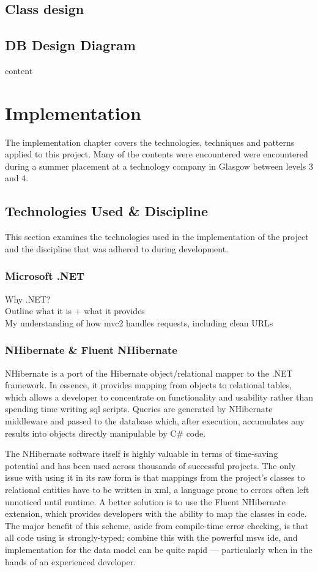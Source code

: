 \documentclass{l4proj}
\begin{document}
\section{Class design}

\section{DB Design Diagram}
content


\chapter{Implementation}
\label{impl}
The implementation chapter covers the technologies, techniques and patterns applied to this project.  Many of the contents were encountered were encountered during a summer placement at a technology company in Glasgow between levels 3 and 4.  

\section{Technologies Used \& Discipline}
This section examines the technologies used in the implementation of the project and the discipline that was adhered to during development.

\subsection{Microsoft .NET}
Why .NET?\\
Outline what it is + what it provides\\
My understanding of how mvc2 handles requests, including clean URLs

\subsection{NHibernate \& Fluent NHibernate}
NHibernate is a port of the Hibernate object/relational mapper to the .NET framework. In essence, it provides mapping from objects to relational tables, which allows a developer to concentrate on functionality and usability rather than spending time writing \gls{sql} scripts. Queries are generated by NHibernate middleware and passed to the database which, after execution, accumulates any results into objects directly manipulable by C\# code. 

The NHibernate software itself is highly valuable in terms of time-saving potential and has been used across thousands of successful projects\cite{NhUse}.  The only issue with using it in its raw form is that mappings from the project's classes to relational entities have to be written in \gls{xml}, a language prone to errors often left unnoticed until runtime.  A better solution is to use the Fluent NHibernate extension, which provides developers with the ability to map the classes in code.  The major benefit of this scheme, aside from compile-time error checking, is that all code using is strongly-typed; combine this with the powerful \gls{msvs} \gls{ide}, and implementation for the data model can be quite rapid --- particularly when in the hands of an experienced developer.
\end{document}
